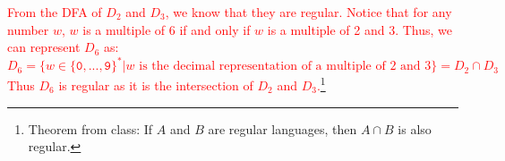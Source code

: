 \textcolor{red}{
    From the DFA of $D_2$ and $D_3$, we know that they are regular. Notice that for any number $w$, $w$ is a multiple of 6 if and only if $w$ is a multiple of 2 and 3. Thus, we can represent $D_6$ as:
    \[
        D_6 = \Big\{w \in \{\texttt{0}, . . . , \texttt{9}\}^*| w \text{ is the decimal representation of a multiple of } 2 \text{ and } 3 \Big\} = D_2 \cap D_3
    \]
    Thus $D_6$ is regular as it is the intersection of $D_2$ and $D_3$.\footnote{Theorem from class: If  $A$  and  $B$  are regular languages, then  $A \cap B$  is also regular.}
}